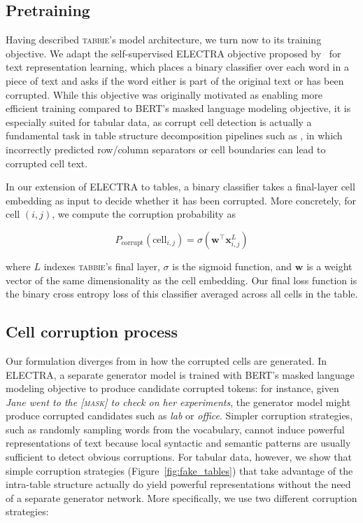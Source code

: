 \documentclass[11pt]{article}
\newcommand{\bvec}[1]{\boldsymbol{#1}}
\newcommand{\name}[0]{\textsc{tabbie}}
\begin{document}
\subsection{Pretraining}
Having described \name's model architecture, we turn now to its training objective. We adapt the self-supervised ELECTRA objective proposed by~\citet{Clark2020ELECTRA:} for text representation learning, which places a binary classifier over each word in a piece of text and asks if the word either is part of the original text or has been corrupted. While this objective was originally motivated as enabling more efficient training compared to BERT's masked language modeling objective, it is especially suited for tabular data, as corrupt cell detection is actually a fundamental task in table structure decomposition pipelines such as \cite{nishida2017understanding, tensmeyer-table, raja-table}, in which incorrectly predicted row/column separators or cell boundaries can lead to corrupted cell text.

In our extension of ELECTRA to tables, a binary classifier takes a final-layer cell embedding as input to decide whether it has been corrupted. More concretely, for cell $(i, j)$, we compute the corruption probability as 

\begin{equation}
    P_{\text{corrupt}}(\text{cell}_{i, j}) = \sigma(\bvec{w}^\intercal \bvec{x}^L_{i,j})
\end{equation}

where $L$ indexes \name's final layer, $\sigma$ is the sigmoid function, and $\bvec{w}$ is a weight vector of the same dimensionality as the cell embedding. Our final loss function is the binary cross entropy loss of this classifier averaged across all cells in the table. 



\subsection{Cell corruption process}
\label{subsec:corruption}
Our formulation diverges from \citet{Clark2020ELECTRA:} in how the corrupted cells are generated. In ELECTRA, a separate generator model is trained with BERT's masked language modeling objective to produce candidate corrupted tokens: for instance, given \emph{Jane went to the \textsc{[mask]} to check on her experiments}, the generator model might produce corrupted candidates such as \emph{lab} or \emph{office}. Simpler corruption strategies, such as randomly sampling words from the vocabulary, cannot induce powerful representations of text because local syntactic and semantic patterns are usually sufficient to detect obvious corruptions. For tabular data, however, we show that simple corruption strategies (Figure~\ref{fig:fake_tables}) that take advantage of the intra-table structure actually do yield powerful representations without the need of a separate generator network. More specifically, we use two different corruption strategies:
 
\end{document}
